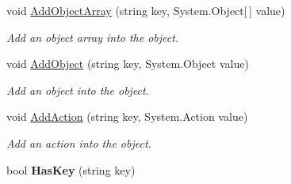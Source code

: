 \begin{DoxyCompactItemize}
void \hyperlink{class_scaffolding_1_1_s_object_ada60ea0906706ebbfc10e04570aafa28}{Add\+Object\+Array} (string key, System.\+Object\mbox{[}$\,$\mbox{]} value)
\begin{DoxyCompactList}\small\item\em Add an object array into the object. \end{DoxyCompactList}\item 
void \hyperlink{class_scaffolding_1_1_s_object_a88d180b12997208394f7c7a5940b67bf}{Add\+Object} (string key, System.\+Object value)
\begin{DoxyCompactList}\small\item\em Add an object into the object. \end{DoxyCompactList}\item 
void \hyperlink{class_scaffolding_1_1_s_object_a21b5f15d73a960dcf8afc7bc7b695d30}{Add\+Action} (string key, System.\+Action value)
\begin{DoxyCompactList}\small\item\em Add an action into the object. \end{DoxyCompactList}\item 
\hypertarget{class_scaffolding_1_1_s_object_a72a6eac036c3a1c8ad2ec2d2ecbcc504}{bool {\bfseries Has\+Key} (string key)}\label{class_scaffolding_1_1_s_object_a72a6eac036c3a1c8ad2ec2d2ecbcc504}


\end{DoxyCompactItemize}
